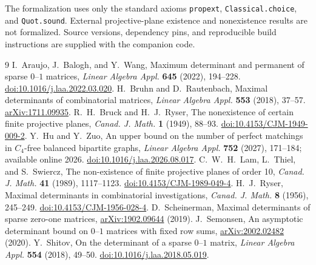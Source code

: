 \documentclass[11pt]{article}
\theoremstyle{remark}
\begin{document}
The formalization uses only the standard axioms \texttt{propext}, \texttt{Classical.choice}, and \texttt{Quot.sound}. External projective-plane existence and nonexistence results are not formalized. Source versions, dependency pins, and reproducible build instructions are supplied with the companion code.

\medskip
\begin{thebibliography}{9}
 I.~Araujo, J.~Balogh, and Y.~Wang,
Maximum determinant and permanent of sparse $0$--$1$ matrices,
\emph{Linear Algebra Appl.} \textbf{645} (2022), 194--228.
\href{https://doi.org/10.1016/j.laa.2022.03.020}{doi:10.1016/j.laa.2022.03.020}.
 H.~Bruhn and D.~Rautenbach,
Maximal determinants of combinatorial matrices,
\emph{Linear Algebra Appl.} \textbf{553} (2018), 37--57.
\href{https://arxiv.org/abs/1711.09935}{arXiv:1711.09935}.
 R.~H.~Bruck and H.~J.~Ryser,
The nonexistence of certain finite projective planes,
\emph{Canad. J. Math.} \textbf{1} (1949), 88--93.
\href{https://doi.org/10.4153/CJM-1949-009-2}{doi:10.4153/CJM-1949-009-2}.
 Y.~Hu and Y.~Zuo,
An upper bound on the number of perfect matchings in $C_4$-free balanced bipartite graphs,
\emph{Linear Algebra Appl.} \textbf{752} (2027), 171--184; available online 2026.
\href{https://doi.org/10.1016/j.laa.2026.08.017}{doi:10.1016/j.laa.2026.08.017}.
 C.~W.~H.~Lam, L.~Thiel, and S.~Swiercz,
The non-existence of finite projective planes of order 10,
\emph{Canad. J. Math.} \textbf{41} (1989), 1117--1123.
\href{https://doi.org/10.4153/CJM-1989-049-4}{doi:10.4153/CJM-1989-049-4}.
 H.~J.~Ryser,
Maximal determinants in combinatorial investigations,
\emph{Canad. J. Math.} \textbf{8} (1956), 245--249.
\href{https://doi.org/10.4153/CJM-1956-028-4}{doi:10.4153/CJM-1956-028-4}.
 D.~Scheinerman,
Maximal determinants of sparse zero-one matrices,
\href{https://arxiv.org/abs/1902.09644}{arXiv:1902.09644} (2019).
 J.~Semonsen,
An asymptotic determinant bound on $0$--$1$ matrices with fixed row sums,
\href{https://arxiv.org/abs/2002.02482}{\mbox{arXiv:2002.02482}} (2020).
 Y.~Shitov,
On the determinant of a sparse $0$--$1$ matrix,
\emph{Linear Algebra Appl.} \textbf{554} (2018), 49--50.
\href{https://doi.org/10.1016/j.laa.2018.05.019}{doi:10.1016/j.laa.2018.05.019}.
\end{thebibliography}
\end{document}
